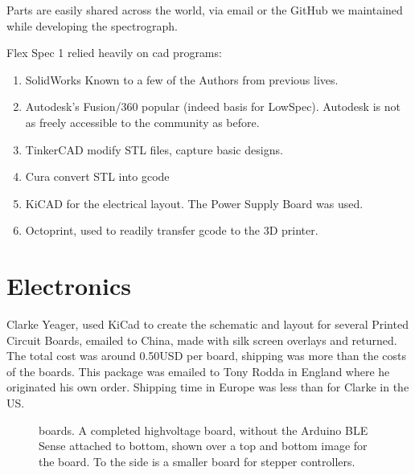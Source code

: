 \documentclass[letterpaper,10pt,english,openany,oneside]{sphinxmanual}
\begin{document}
\sphinxAtStartPar
Parts are easily shared across the world, via email or the GitHub
we maintained while developing the spectrograph.

\sphinxAtStartPar
Flex Spec 1 relied heavily on cad programs:
\begin{enumerate}
%
\item {} 
\sphinxAtStartPar
SolidWorks Known to a few of the Authors from previous lives.

\item {} 
\sphinxAtStartPar
Autodesk’s Fusion/360 popular (indeed basis for LowSpec). Autodesk is not as freely accessible to the community as before.

\item {} 
\sphinxAtStartPar
TinkerCAD modify STL files, capture basic designs.

\item {} 
\sphinxAtStartPar
Cura convert STL into gcode

\item {} 
\sphinxAtStartPar
KiCAD for the electrical layout. The Power Supply Board was used.

\item {} 
\sphinxAtStartPar
Octoprint, used to readily transfer gcode to the 3D printer.

\end{enumerate}


\chapter{Electronics}
\label{\detokenize{electronics:electronics}}\label{\detokenize{electronics::doc}}
\sphinxAtStartPar
Clarke Yeager, used KiCad  to create the schematic and layout for
several Printed Circuit Boards, emailed to China, made \textendash{} with silk
screen overlays and returned. The total cost was around 0.50USD per
board, shipping was more than the costs of the boards. This package
was emailed to Tony Rodda in England where he originated his own
order. Shipping time in Europe was less than for Clarke in the US.

\begin{figure}[htbp]
\centering
\capstart

\noindent{}
\caption{ boards. A completed high\sphinxhyphen{}voltage board, without the Arduino BLE Sense attached to bottom, shown over a top and bottom image for the board. To the side is a smaller board for stepper controllers.}\label{\detokenize{electronics:id2}}\end{figure}
\end{document}
